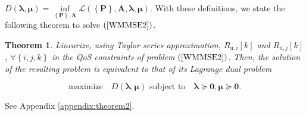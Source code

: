 \documentclass[10pt,journal]{IEEEtran}
\newcommand{\paren}[1]{\left({#1}\right)}
\newcommand{\bracket}[1]{{\left [{#1}\right ]}}
\newcommand{\braces}[1]{{\left\{ {#1}\right\}}}
\newtheorem{theorem}{Theorem}
\theoremstyle{definition}
\begin{document}
$D\paren{\boldsymbol{\lambda},\boldsymbol{\mu}}=\underset{\braces{\mathbf{P}},\mathbf{A}}\inf \mathcal{L}\paren{\braces{\mathbf{P}},\mathbf{A},\boldsymbol{\lambda},\boldsymbol{\mu}}$. %
With these definitions, we state the following theorem to solve $\paren{\ref{WMMSE2}}$.
\begin{theorem}\label{theorem: dual}
Linearize, using Taylor series approximation, $R_{\textrm{u},i}\bracket{k}$ and $R_{\textrm{d},j}\bracket{k}$, $\forall\braces{i,j,k}$ in the QoS constraints of problem $\paren{\ref{WMMSE2}}$. Then, the solution of the resulting problem is equivalent to that of its Lagrange dual problem %
\par\noindent\small
\begin{equation}
\label{dualproblem}
\text{maximize} \quad D\paren{\boldsymbol{\lambda},\boldsymbol{\mu}}\text{  subject to}\quad  \boldsymbol{\lambda}  \succeq \mathbf{0}, \boldsymbol{\mu} \succeq \mathbf{0}.    
\end{equation}

\end{theorem}
\begin{IEEEproof}
See Appendix \ref{appendix:theorem2}.
\end{IEEEproof}
\end{document}
